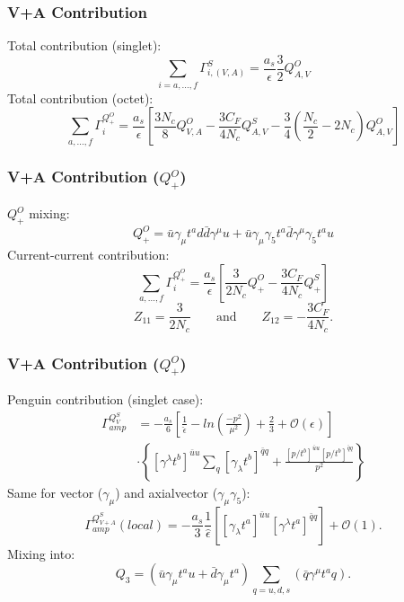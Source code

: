 \documentclass{beamer}
\begin{document}
\begin{frame}
\frametitle{V+A Contribution}
Total contribution (singlet):
\begin{equation*}
	\sum_{i=a,\ldots,f} \Gamma^S_{i,(V,A)} = \frac{a_s}{\epsilon} \frac{3}{2} Q^O_{A,V}
\end{equation*}
Total contribution (octet):
\begin{equation*}
	\sum_{a,\ldots,f}\Gamma^{Q^O_+}_{i} = \frac{a_s}{\epsilon} \left[\frac{3 N_c}{8}Q^O_{V,A} - \frac{3 C_F}{4N_c}Q^S_{A,V} - \frac{3}{4}\left(\frac{N_c}{2} - {2}{N_c} \right)Q^O_{A,V}\right]
\end{equation*}
\end{frame}

\begin{frame}
\frametitle{V+A Contribution ($Q^O_+$)}
$Q^O_+$ mixing:
\begin{equation*}
	Q^O_+ = \bar u \gamma_\mu t^a d \bar d \gamma^\mu u + \bar u \gamma_\mu \gamma_5 t^a \bar d \gamma^\mu \gamma_5 t^a u
\end{equation*}
Current-current contribution:
\begin{equation*}
	\sum_{a,\ldots,f}\Gamma^{Q^O_+}_{i} = \frac{a_s}{\epsilon} \left[\frac{3}{2N_c} Q^O_+ - \frac{3 C_F}{4N_c}Q^S_+ \right]
\end{equation*}
\begin{equation*}
	Z_{11} = \frac{3}{2N_c} \qquad \text{and} \qquad Z_{12} = - \frac{3C_F}{4N_c}.
\end{equation*}
\end{frame}

\begin{frame}
\frametitle{V+A Contribution ($Q^O_+$)}
Penguin contribution (singlet case):
\begin{equation*}
\begin{split}
	\Gamma^{Q^S_V}_{amp} &= -\frac{a_s}{6} \left[\frac{1}{\hat \epsilon} - ln \left(\frac{-p^2}{\mu^2}\right) + \frac{2}{3} + \mathcal{O}(\epsilon) \right] \\ 
	&\cdot \left\{ \left[ \gamma^\lambda t^b \right ]^{\bar uu} \sum_q \left[ \gamma_\lambda t^b \right ]^{\bar qq} + \frac{\left[p\!\!\!/ t^b\right]^{\bar uu} \left[p\!\!\!/ t^b\right]^{\bar qq}}{p^2}\right\}
\end{split}
\end{equation*}
Same for vector ($\gamma_\mu$) and axialvector ($\gamma_\mu \gamma_5$):
\begin{equation*}
	\Gamma^{Q^S_{V+A}}_{amp}(local) = - \frac{a_s}{3}\frac{1}{\hat \epsilon} \left[ [\gamma_\lambda t^a]^{\bar uu} [\gamma^\lambda t^a]^{\bar qq}  \right ] + \mathcal{O}(1).
\end{equation*}
Mixing into:
\begin{equation*}
	Q_3 = (\bar u\gamma_\mu t^a u + \bar d \gamma_\mu t^a) \sum_{q=u,d,s} (\bar q \gamma^\mu t^a q).  	
\end{equation*}
\end{frame}
\end{document}
